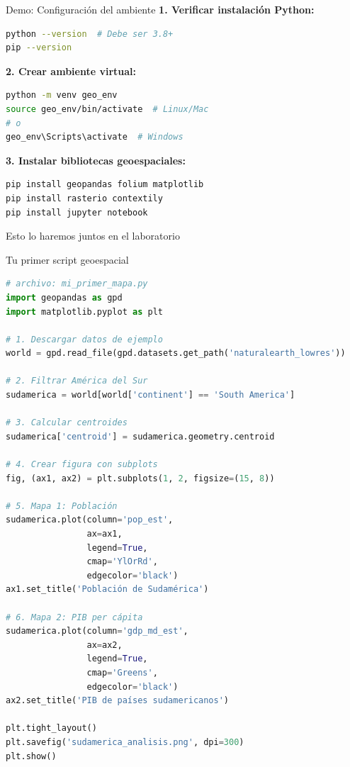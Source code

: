 \documentclass[10pt]{beamer}
\begin{document}
\begin{frame}[fragile]{Demo: Configuración del ambiente}
    \textbf{1. Verificar instalación Python:}
    \begin{lstlisting}[language=bash]
python --version  # Debe ser 3.8+
pip --version
    \end{lstlisting}
    
    \textbf{2. Crear ambiente virtual:}
    \begin{lstlisting}[language=bash]
python -m venv geo_env
source geo_env/bin/activate  # Linux/Mac
# o
geo_env\Scripts\activate  # Windows
    \end{lstlisting}
    
    \textbf{3. Instalar bibliotecas geoespaciales:}
    \begin{lstlisting}[language=bash]
pip install geopandas folium matplotlib
pip install rasterio contextily
pip install jupyter notebook
    \end{lstlisting}
    
    \begin{center}
        \textcolor{usachred}{} Esto lo haremos juntos en el laboratorio
    \end{center}
\end{frame}

\begin{frame}[fragile]{Tu primer script geoespacial}
    \begin{lstlisting}[language=Python, basicstyle=\tiny\ttfamily]
# archivo: mi_primer_mapa.py
import geopandas as gpd
import matplotlib.pyplot as plt

# 1. Descargar datos de ejemplo
world = gpd.read_file(gpd.datasets.get_path('naturalearth_lowres'))

# 2. Filtrar América del Sur
sudamerica = world[world['continent'] == 'South America']

# 3. Calcular centroides
sudamerica['centroid'] = sudamerica.geometry.centroid

# 4. Crear figura con subplots
fig, (ax1, ax2) = plt.subplots(1, 2, figsize=(15, 8))

# 5. Mapa 1: Población
sudamerica.plot(column='pop_est', 
                ax=ax1, 
                legend=True,
                cmap='YlOrRd',
                edgecolor='black')
ax1.set_title('Población de Sudamérica')

# 6. Mapa 2: PIB per cápita  
sudamerica.plot(column='gdp_md_est',
                ax=ax2,
                legend=True, 
                cmap='Greens',
                edgecolor='black')
ax2.set_title('PIB de países sudamericanos')

plt.tight_layout()
plt.savefig('sudamerica_analisis.png', dpi=300)
plt.show()
    \end{lstlisting}
\end{frame}
\end{document}
